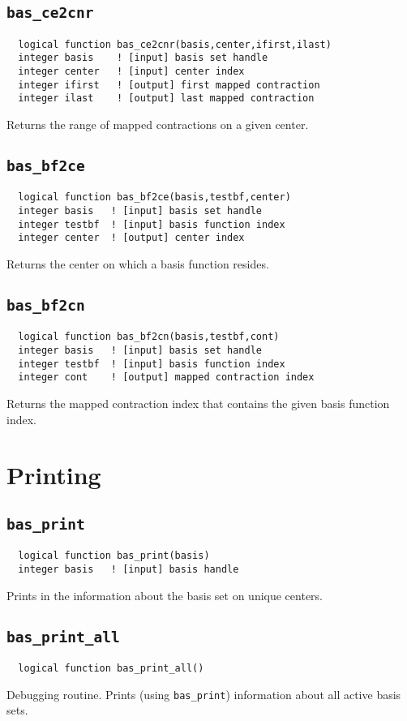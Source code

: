 \subsection{{\tt bas\_ce2cnr}}
\begin{verbatim}
  logical function bas_ce2cnr(basis,center,ifirst,ilast)
  integer basis    ! [input] basis set handle         
  integer center   ! [input] center index 
  integer ifirst   ! [output] first mapped contraction
  integer ilast    ! [output] last mapped contraction
\end{verbatim}
Returns the range of mapped contractions on a given center.

\subsection{{\tt bas\_bf2ce}}
\begin{verbatim}
  logical function bas_bf2ce(basis,testbf,center)
  integer basis   ! [input] basis set handle         
  integer testbf  ! [input] basis function index
  integer center  ! [output] center index
\end{verbatim}
Returns the center on which a basis function resides.

\subsection{{\tt bas\_bf2cn}}
\begin{verbatim}
  logical function bas_bf2cn(basis,testbf,cont)
  integer basis   ! [input] basis set handle         
  integer testbf  ! [input] basis function index
  integer cont    ! [output] mapped contraction index
\end{verbatim}
Returns the mapped contraction index that contains the given basis
function index.

\section{Printing}

\subsection{{\tt bas\_print}}
\begin{verbatim}
  logical function bas_print(basis)
  integer basis   ! [input] basis handle
\end{verbatim}
Prints in the information about the basis set on unique centers.

\subsection{{\tt bas\_print\_all}}
\begin{verbatim}
  logical function bas_print_all()
\end{verbatim}
Debugging routine.  Prints (using \verb+bas_print+) information about
all active basis sets.

